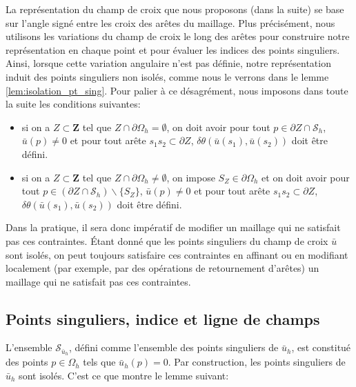 \begin{remark}
La représentation du champ de croix que nous proposons (dans la suite) se base sur l'angle signé entre les croix des arêtes du maillage. Plus précisément, nous utilisons les variations du champ de croix le long des arêtes pour construire notre représentation en chaque point et pour évaluer les indices des points singuliers. Ainsi, lorsque cette variation angulaire n'est pas définie, notre représentation induit des points singuliers non isolés, comme nous le verrons dans le lemme \ref{lem:isolation_pt_sing}.
Pour palier à ce désagrément, nous imposons dans toute la suite les conditions suivantes:\\
\begin{itemize}
 \item si on a $Z\subset\mathbf{Z}$ tel que $Z\cap\partial\Omega_h=\emptyset$, on doit avoir pour tout $p\in\partial Z\cap\mathcal{S}_h$, $\bar{u}(p)\neq 0$ et pour tout arête $s_1s_2\subset\partial Z$, $\delta\theta(\bar{u}(s_1),\bar{u}(s_2))$ doit être défini.\\
 \item si on a $Z\subset\mathbf{Z}$ tel que $Z\cap\partial\Omega_h\neq\emptyset$, on impose $S_Z\in\partial\Omega_h$ et on doit avoir pour tout $p\in(\partial Z\cap\mathcal{S}_h)\backslash\{S_Z\}$, $\bar{u}(p)\neq 0$ et pour tout arête $s_1s_2\subset\partial Z$, $\delta\theta(\bar{u}(s_1),\bar{u}(s_2))$ doit être défini.\\
\end{itemize}
Dans la pratique, il sera donc impératif de modifier un maillage qui ne satisfait pas ces contraintes. %
Étant donné que les points singuliers du champ de croix $\bar{u}$ sont isolés, on peut toujours satisfaire ces contraintes en affinant ou en modifiant localement (par exemple, par des opérations de retournement d'arêtes) un maillage qui ne satisfait pas ces contraintes.
\end{remark}


\subsection{Points singuliers, indice et ligne de champs}
\label{subsec:pt_sing_ind_lign_champ}

L'ensemble $\mathcal{S}_{\bar{u}_h}$, défini comme l'ensemble des points singuliers de $\bar{u}_h$, est constitué des points $p \in \Omega_h$ tels que $\bar{u}_h(p) = 0$. Par construction, les points singuliers de $\bar{u}_h$ sont isolés. C'est ce que montre le lemme suivant:

